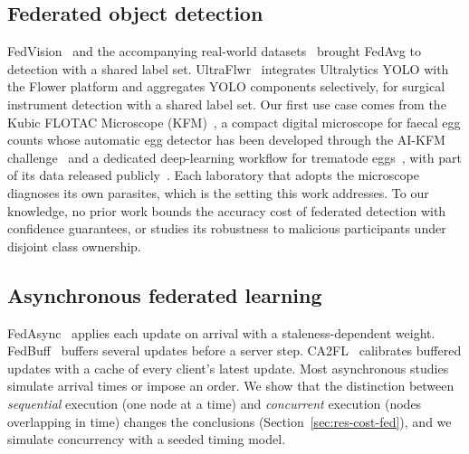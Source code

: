 \documentclass[pdflatex,sn-mathphys-num]{sn-jnl}
\begin{document}
\subsection{Federated object detection}
FedVision~\cite{liu2020fedvision} and the accompanying real-world datasets~\cite{luo2019realworld} brought FedAvg to detection with a shared label set. UltraFlwr~\cite{li2025ultraflwr} integrates Ultralytics YOLO with the Flower platform and aggregates YOLO components selectively, for surgical instrument detection with a shared label set. Our first use case comes from the Kubic FLOTAC Microscope (KFM)~\cite{cringoli2021kfm}, a compact digital microscope for faecal egg counts whose automatic egg detector has been developed through the AI-KFM challenge~\cite{capuozzo2024aikfm} and a dedicated deep-learning workflow for trematode eggs~\cite{capuozzo2026ijp}, with part of its data released publicly~\cite{capuozzo2025trematodes}. Each laboratory that adopts the microscope diagnoses its own parasites, which is the setting this work addresses. To our knowledge, no prior work bounds the accuracy cost of federated detection with confidence guarantees, or studies its robustness to malicious participants under disjoint class ownership.

\subsection{Asynchronous federated learning}
FedAsync~\cite{xie2019fedasync} applies each update on arrival with a staleness-dependent weight. FedBuff~\cite{nguyen2022fedbuff} buffers several updates before a server step. CA2FL~\cite{wang2024ca2fl} calibrates buffered updates with a cache of every client's latest update. Most asynchronous studies simulate arrival times or impose an order. We show that the distinction between \emph{sequential} execution (one node at a time) and \emph{concurrent} execution (nodes overlapping in time) changes the conclusions (Section~\ref{sec:res-cost-fed}), and we simulate concurrency with a seeded timing model.
\end{document}
